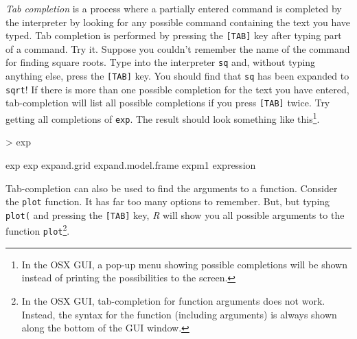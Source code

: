 \documentclass[10pt,letterpaper]{article}
\begin{document}
\emph{Tab completion} is a process where a partially entered command is completed by the interpreter by looking for any possible command containing the text you have typed.  Tab completion is performed by pressing the \texttt{[TAB]} key after typing part of a command.  Try it.  Suppose you couldn't remember the name of the command for finding square roots.  Type into the interpreter \texttt{sq} and, without typing anything else, press the \texttt{[TAB]} key.  You should find that \texttt{sq} has been expanded to \texttt{sqrt}!  If there is more than one possible completion for the text you have entered, tab-completion will list all possible completions if you press \texttt{[TAB]} twice.  Try getting all completions of \texttt{exp}.  The result should look something like this\footnote{In the OSX GUI, a pop-up menu showing possible completions will be shown instead of printing the possibilities to the screen.}.

\begin{Schunk}
\begin{Sinput}
> exp
\end{Sinput}
\end{Schunk}
\begin{Schunk}
\begin{Soutput}
exp
exp	expand.grid	expand.model.frame	expm1	expression
\end{Soutput}
\end{Schunk}

Tab-completion can also be used to find the arguments to a function.  Consider the \texttt{plot} function.  It has far too many options to remember.  But, but typing \texttt{plot(} and pressing the \texttt{[TAB]} key, \emph{R} will show you all possible arguments to the function \texttt{plot}\footnote{In the OSX GUI, tab-completion for function arguments does not work.  Instead, the syntax for the function (including arguments) is always shown along the bottom of the GUI window.}.
\end{document}
